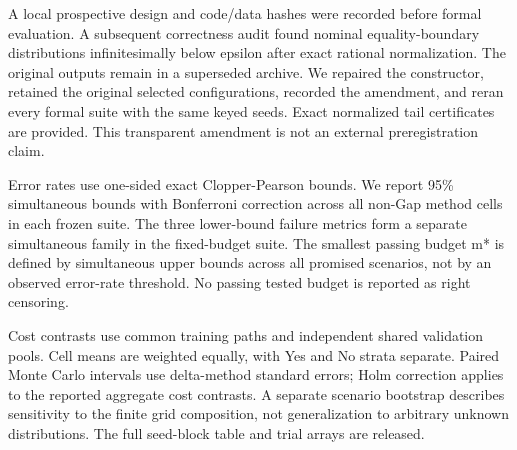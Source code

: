 \documentclass[10pt]{article}
\begin{document}
A local prospective design and code/data hashes were recorded before formal evaluation. A subsequent correctness audit found nominal equality-boundary distributions infinitesimally below epsilon after exact rational normalization. The original outputs remain in a superseded archive. We repaired the constructor, retained the original selected configurations, recorded the amendment, and reran every formal suite with the same keyed seeds. Exact normalized tail certificates are provided. This transparent amendment is not an external preregistration claim.

\begin{table}[htbp]\centering\small\caption{Experimental inventory. Method-trial evaluations reuse common samples across methods; they are not independent datasets.}
\end{table}
Error rates use one-sided exact Clopper-Pearson bounds. We report 95\% simultaneous bounds with Bonferroni correction across all non-Gap method cells in each frozen suite. The three lower-bound failure metrics form a separate simultaneous family in the fixed-budget suite. The smallest passing budget m* is defined by simultaneous upper bounds across all promised scenarios, not by an observed error-rate threshold. No passing tested budget is reported as right censoring.

Cost contrasts use common training paths and independent shared validation pools. Cell means are weighted equally, with Yes and No strata separate. Paired Monte Carlo intervals use delta-method standard errors; Holm correction applies to the reported aggregate cost contrasts. A separate scenario bootstrap describes sensitivity to the finite grid composition, not generalization to arbitrary unknown distributions. The full seed-block table and trial arrays are released.
\end{document}
